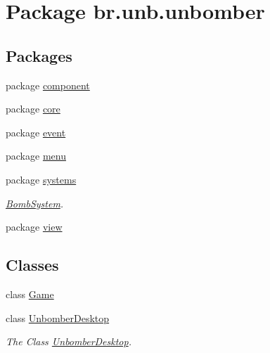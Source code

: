 \hypertarget{namespacebr_1_1unb_1_1unbomber}{\section{Package br.\+unb.\+unbomber}
\label{namespacebr_1_1unb_1_1unbomber}
}
\subsection*{Packages}
\begin{DoxyCompactItemize}
\item 
package \hyperlink{namespacebr_1_1unb_1_1unbomber_1_1component}{component}
\item 
package \hyperlink{namespacebr_1_1unb_1_1unbomber_1_1core}{core}
\item 
package \hyperlink{namespacebr_1_1unb_1_1unbomber_1_1event}{event}
\item 
package \hyperlink{namespacebr_1_1unb_1_1unbomber_1_1menu}{menu}
\item 
package \hyperlink{namespacebr_1_1unb_1_1unbomber_1_1systems}{systems}
\begin{DoxyCompactList}\small\item\em \hyperlink{classbr_1_1unb_1_1unbomber_1_1systems_1_1_bomb_system}{Bomb\+System}. \end{DoxyCompactList}\item 
package \hyperlink{namespacebr_1_1unb_1_1unbomber_1_1view}{view}
\end{DoxyCompactItemize}
\subsection*{Classes}
\begin{DoxyCompactItemize}
\item 
class \hyperlink{classbr_1_1unb_1_1unbomber_1_1_game}{Game}
\item 
class \hyperlink{classbr_1_1unb_1_1unbomber_1_1_unbomber_desktop}{Unbomber\+Desktop}
\begin{DoxyCompactList}\small\item\em The Class \hyperlink{classbr_1_1unb_1_1unbomber_1_1_unbomber_desktop}{Unbomber\+Desktop}. \end{DoxyCompactList}\end{DoxyCompactItemize}
